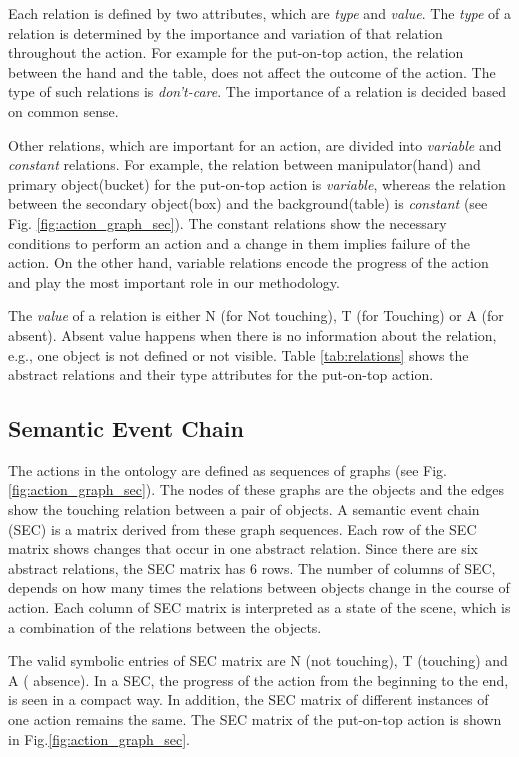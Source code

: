 Each relation is defined by two attributes, which are  \emph{type} and \emph{value}.
The \emph{type} of a relation is determined by the importance and variation of that relation throughout the action.
For example for the put-on-top action, the relation between the hand and the table, does not affect the outcome of the action.
The type of such relations is \emph{don't-care}.
The importance of a relation is decided based on common sense.

Other relations, which are important for an action, are divided into \emph{variable} and \emph{constant} relations.
For example, the relation between manipulator(hand) and primary object(bucket) for the put-on-top action is \emph{variable},
whereas the relation between the secondary object(box) and the background(table) is \emph{constant} (see Fig. \ref{fig:action_graph_sec}).
The constant relations show the necessary conditions to perform an action and a change in them implies failure of the action.
On the other hand, variable relations encode the progress of the action and play the most important role in our methodology.

The \emph{value} of a relation is either N (for Not touching), T (for Touching) or A (for absent).
Absent value happens when there is no information about the relation, e.g., one object is not defined or not visible.
Table \ref{tab:relations} shows the abstract relations and their type attributes for the put-on-top action.


\subsection{Semantic Event Chain}
\label{sec:SEC}
The actions in the ontology are defined as sequences of graphs (see Fig.\ref{fig:action_graph_sec}).
The nodes of these graphs are the objects and the edges show the touching relation between a pair of objects.
A semantic event chain (SEC) \cite{Aksoy11} is a matrix derived from these graph sequences.
Each row of the SEC matrix shows changes that occur in one abstract relation.
Since there are six abstract relations, the SEC matrix has 6 rows.
The number of columns of SEC, depends on how many times the relations between objects change in the course of action.
Each column of SEC matrix is interpreted as a state of the scene, which is a combination of the relations between the objects.


The valid symbolic entries of SEC matrix are N (not touching), T (touching) and A ( absence).
In a SEC, the progress of the action from the beginning to the end, is seen in a compact way.
In addition, the SEC matrix of different instances of one action remains the same.
The SEC matrix of the put-on-top action is shown in Fig.\ref{fig:action_graph_sec}.

